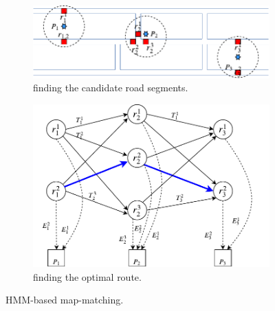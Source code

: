 \begin{figure}[tb!]
  \centering
  \begin{subfigure}{0.4\textwidth}
    \includegraphics[width = \textwidth]{Figures/Fig-HMM-model-road.pdf}
    \caption{finding the candidate road segments.}\label{fig:hmm-model-a}
    \vspace{1ex}
  \end{subfigure}
  \begin{subfigure}{0.42\textwidth}
    \includegraphics[width = \textwidth, height = 0.6\textwidth]{Figures/Fig-HMM-model.pdf}
    \caption{finding the optimal route. }\label{fig:hmm-model-b}
  \end{subfigure}
  \vspace{-1ex}
  \caption{HMM-based map-matching.}
  \label{fig:hmm-model}
 \vspace{-4ex}
\end{figure}







